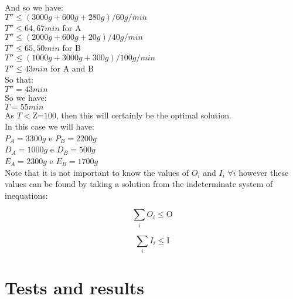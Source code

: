 \documentclass[preprint,12pt,authoryear]{elsarticle}
\begin{document}
And so we have: \\

$T'' \leq (3000g + 600g + 280g) / 60g/min$ \\

$T'' \leq 64,67 min$ \quad for A \\

$T'' \leq (2000g + 600g + 20g) / 40g/min$ \\

$T'' \leq 65,50 min$ \quad for B \\

$T'' \leq (1000g + 3000g + 300g) / 100g/min$ \\

$T'' \leq 43 min$ \quad for A and B \\

So that: \\

$T'' = 43 min$ \\

So we have: \\

$ T = 55 min$ \\

As $T<\textrm{Z=100}$, then this will certainly be the optimal solution. \\

In this case we will have: \\

$P_A = 3300g$ e $P_B=2200g$ \\

$D_A = 1000g$ e $D_B = 500g$ \\

$E_A = 2300g$ e $E_B = 1700g$ \\

Note that it is not important to know the values of $O_i$ and $I_i$ $\forall i$ however these values can be found by taking a solution from the indeterminate system of inequations:

\begin{equation}
\sum_i{O_i} \leq \textrm{O}
\end{equation}

\begin{equation}
\sum_i{I_i} \leq \textrm{I}
\end{equation}

\section{Tests and results}
\label{}
\end{document}
